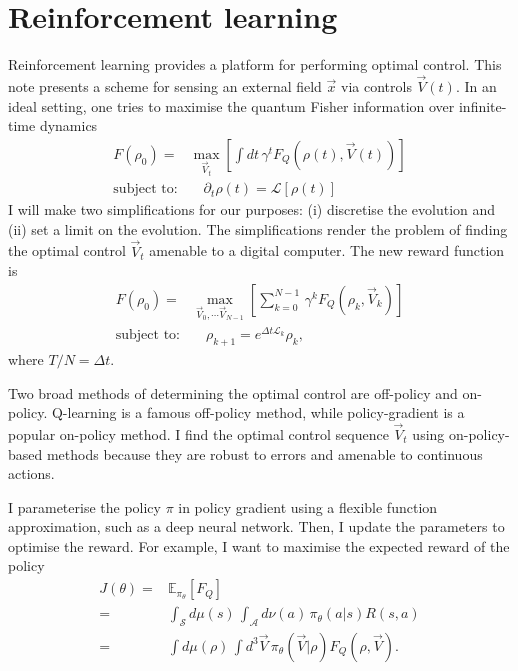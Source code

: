 \documentclass[12pt]{article}
\newcommand{\E}{\mathbb{E}}
\begin{document}
\newpage

\section{Reinforcement learning}

Reinforcement learning provides a platform for performing optimal control.  This note presents a scheme for sensing an external field $\vec{x}$ via controls $\vec{V}(t)$.  In an ideal setting, one tries to maximise the quantum Fisher information over infinite-time dynamics
\begin{align}
    F(\rho_0) = & \max_{\vec{V}_t} \left[ \int dt \, \gamma^t F_{Q}(\rho(t), \vec{V}(t)) \right] \\
    \text{subject to:} & \quad \partial_t \rho(t) = \mathcal{L}[\rho(t)]
\end{align}
I will make two simplifications for our purposes: (i) discretise the evolution and (ii) set a limit on the evolution.  The simplifications render the problem of finding the optimal control $\vec{V}_t$ amenable to a digital computer.  The new reward function is
\begin{align}
    F(\rho_0) = & \max_{\vec{V}_0, \cdots \vec{V}_{N-1}} \left[ \sum_{k=0}^{N-1} \, \gamma^k F_{Q}(\rho_k, \vec{V}_k) \right] \\
    \text{subject to:} & \quad \rho_{k+1} = e^{\Delta t \mathcal{L}_k} \rho_{k},
\end{align}
where $T/N = \Delta t$.

Two broad methods of determining the optimal control are off-policy and on-policy.  Q-learning is a famous off-policy method, while policy-gradient is a popular on-policy method.  I find the optimal control sequence $\vec{V}_t$ using on-policy-based methods because they are robust to errors and amenable to continuous actions.

I parameterise the policy $\pi$ in policy gradient using a flexible function approximation, such as a deep neural network.  Then, I update the parameters to optimise the reward.  For example, I want to maximise the expected reward of the policy
\begin{align}
    J(\theta) = & \E_{\pi_\theta}[F_Q]\\
    = & \int_{\mathcal{S}}d \mu(s) \, \int_{\mathcal{A}} d \nu(a) \, \pi_{\theta}(a|s)R(s,a)\\
    = & \int d \mu(\rho) \, \int d^3 \vec{V} \, \pi_{\theta}(\vec{V}|\rho)F_Q(\rho, \vec{V}).
\end{align}
\end{document}
